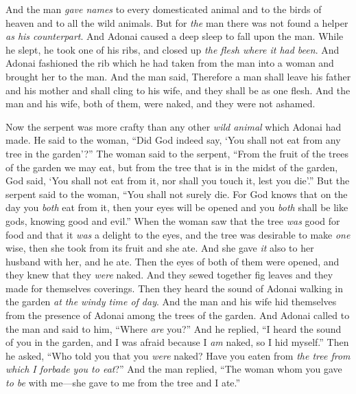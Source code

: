 \begin{biblechapter}
\verse And the man \textit{gave names} to every domesticated animal and to the birds of heaven and to all the wild animals. But for \textit{the} man there was not found a helper \textit{as his counterpart}.
\verse And Adonai caused a deep sleep to fall upon the man. While he slept, he took one of his ribs, and closed up \textit{the flesh where it had been}.
\verse And Adonai fashioned the rib which he had taken from the man into a woman and brought her to the man.
\verse And the man said,
\verse Therefore a man shall leave his father and his mother and shall cling to his wife, and they shall be as one flesh.
\verse And the man and his wife, both of them, were naked, and they were not ashamed.
\end{biblechapter}

\begin{biblechapter} %
 Now the serpent was more crafty than any other \textit{wild animal} which Adonai had made. He said to the woman, “Did God indeed say, ‘You shall not eat from any tree in the garden’?”
\verse The woman said to the serpent, “From the fruit of the trees of the garden we may eat,
\verse but from the tree that is in the midst of the garden, God said, ‘You shall not eat from it, nor shall you touch it, lest you die’.”
\verse But the serpent said to the woman, “You shall not surely die.
\verse For God knows that on the day you \textit{both} eat from it, then your eyes will be opened and you \textit{both} shall be like gods, knowing good and evil.”
\verse When the woman saw that the tree \textit{was} good for food and that it \textit{was} a delight to the eyes, and the tree was desirable to make \textit{one} wise, then she took from its fruit and she ate. And she gave \textit{it} also to her husband with her, and he ate.
\verse Then the eyes of both of them were opened, and they knew that they \textit{were} naked. And they sewed together fig leaves and they made for themselves coverings.
\verse Then they heard the sound of Adonai walking in the garden \textit{at the windy time of day}. And the man and his wife hid themselves from the presence of Adonai among the trees of the garden.
\verse And Adonai called to the man and said to him, “Where \textit{are} you?”
\verse And he replied, “I heard the sound of you in the garden, and I was afraid because I \textit{am} naked, so I hid myself.”
\verse Then he asked, “Who told you that you \textit{were} naked? Have you eaten from \textit{the tree from which I forbade you to eat}?”
\verse And the man replied, “The woman whom you gave \textit{to be} with me—she gave to me from the tree and I ate.”

\end{biblechapter}
